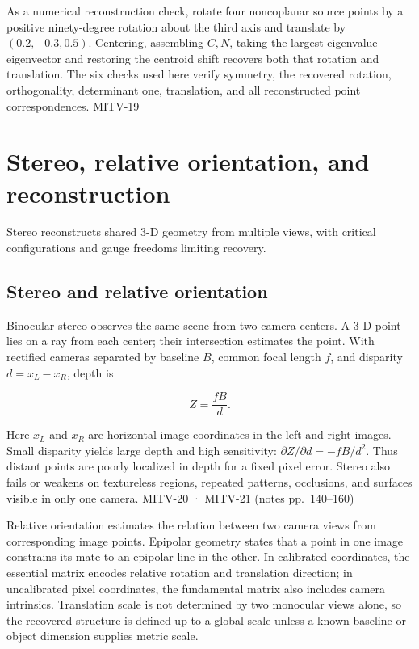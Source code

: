 As a numerical reconstruction check, rotate four noncoplanar source points by a positive ninety-degree rotation about the third axis and translate by \((0.2,-0.3,0.5)\). Centering, assembling \(C,N\), taking the largest-eigenvalue eigenvector and restoring the centroid shift recovers both that rotation and translation. The six checks used here verify symmetry, the recovered rotation, orthogonality, determinant one, translation, and all reconstructed point correspondences. \hyperref[04-visual-computing-ii-ch036-mitv-19---absolute-orientation-in-closed-form-outliers-and-robustness-ransac]{MITV-19}

\section{Stereo, relative orientation, and reconstruction}\label{04-visual-computing-ii-ch032-stereo-relative-orientation-and-reconstruction}

Stereo reconstructs shared 3-D geometry from multiple views, with critical configurations and gauge freedoms limiting recovery.

\subsection{Stereo and relative orientation}\label{04-visual-computing-ii-ch032-stereo-and-relative-orientation}

Binocular stereo observes the same scene from two camera centers. A 3-D point lies on a ray from each center; their intersection estimates the point. With rectified cameras separated by baseline \(B\), common focal length \(f\), and disparity \(d=x_L-x_R\), depth is

\[
Z=\frac{fB}{d}.
\]

Here \(x_L\) and \(x_R\) are horizontal image coordinates in the left and right images. Small disparity yields large depth and high sensitivity: \(\partial Z/\partial d=-fB/d^2\). Thus distant points are poorly localized in depth for a fixed pixel error. Stereo also fails or weakens on textureless regions, repeated patterns, occlusions, and surfaces visible in only one camera. \hyperref[04-visual-computing-ii-ch036-mitv-20---space-of-rotations-regular-tessellations-critical-surfaces-binocular-stereo]{MITV-20} · \hyperref[04-visual-computing-ii-ch036-mitv-21---relative-orientation-binocular-stereo-structure-quadrics-calibration-reprojection]{MITV-21} (notes pp.~140--160)

Relative orientation estimates the relation between two camera views from corresponding image points. Epipolar geometry states that a point in one image constrains its mate to an epipolar line in the other. In calibrated coordinates, the essential matrix encodes relative rotation and translation direction; in uncalibrated pixel coordinates, the fundamental matrix also includes camera intrinsics. Translation scale is not determined by two monocular views alone, so the recovered structure is defined up to a global scale unless a known baseline or object dimension supplies metric scale.

